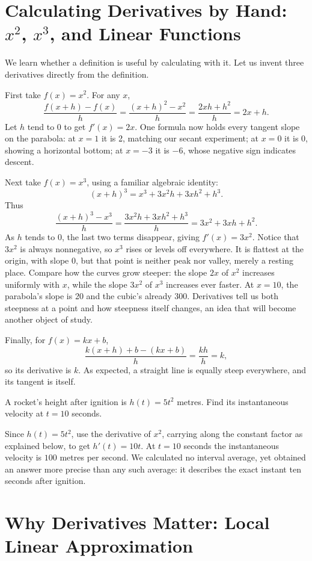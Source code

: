 \section{Calculating Derivatives by Hand: $x^2$, $x^3$, and Linear Functions}

We learn whether a definition is useful by calculating with it. Let us invent three derivatives directly from the definition.

First take $f(x)=x^2$. For any $x$,
\[
\frac{f(x+h)-f(x)}{h}=\frac{(x+h)^2-x^2}{h}=\frac{2xh+h^2}{h}=2x+h.
\]
Let $h$ tend to 0 to get $f'(x)=2x$. One formula now holds every tangent slope on the parabola: at $x=1$ it is 2, matching our secant experiment; at $x=0$ it is 0, showing a horizontal bottom; at $x=-3$ it is $-6$, whose negative sign indicates descent.

Next take $f(x)=x^3$, using a familiar algebraic identity:
\[
(x+h)^3=x^3+3x^2h+3xh^2+h^3.
\]
Thus
\[
\frac{(x+h)^3-x^3}{h}=\frac{3x^2h+3xh^2+h^3}{h}=3x^2+3xh+h^2.
\]
As $h$ tends to 0, the last two terms disappear, giving $f'(x)=3x^2$. Notice that $3x^2$ is always nonnegative, so $x^3$ rises or levels off everywhere. It is flattest at the origin, with slope 0, but that point is neither peak nor valley, merely a resting place. Compare how the curves grow steeper: the slope $2x$ of $x^2$ increases uniformly with $x$, while the slope $3x^2$ of $x^3$ increases ever faster. At $x=10$, the parabola's slope is 20 and the cubic's already 300. Derivatives tell us both steepness at a point and how steepness itself changes, an idea that will become another object of study.

Finally, for $f(x)=kx+b$,
\[
\frac{k(x+h)+b-(kx+b)}{h}=\frac{kh}{h}=k,
\]
so its derivative is $k$. As expected, a straight line is equally steep everywhere, and its tangent is itself.

\begin{li}
A rocket's height after ignition is $h(t)=5t^2$ metres. Find its instantaneous velocity at $t=10$ seconds.
\end{li}

Since $h(t)=5t^2$, use the derivative of $x^2$, carrying along the constant factor as explained below, to get $h'(t)=10t$. At $t=10$ seconds the instantaneous velocity is $100$ metres per second. We calculated no interval average, yet obtained an answer more precise than any such average: it describes the exact instant ten seconds after ignition.

\section{Why Derivatives Matter: Local Linear Approximation}

